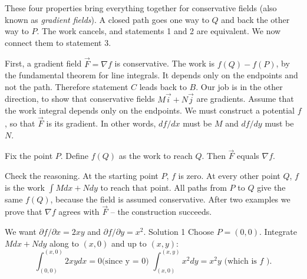{
These four properties bring everything together for conservative fields (also known as \emph{gradient
fields}). A closed path goes one way to $Q$ and back the other way to $P$. The work
cancels, and statements 1 and 2 are equivalent. We now connect them to statement 3. 

First, a gradient field $\vec F = \nabla f$ is conservative. The work is $f(Q) - f(P)$, by the
fundamental theorem for line integrals. It depends only on the endpoints and not the
path. Therefore statement $C$ leads back to $B$.
Our job is in the other direction, to show that conservative fields $M\vec i + N\vec j$ are
gradients. Assume that the work integral depends only on the endpoints. We must
construct a potential $f$, so that $\vec F$ is its gradient. In other words, $df/dx$ must be $M$ and
$df/dy$ must be $N$.

Fix the point $P$. Define $f(Q)$ as the work to reach $Q$. Then $\vec F$ equals $\nabla f$.

Check the reasoning. At the starting point $P$, $f$ is zero. At every other point $Q$, $f$ is
the work $\int M dx + N dy$ to reach that point. All paths from $P$ to $Q$ give the same $f(Q)$,
because the field is assumed conservative. After two examples we prove that $\nabla f$
agrees with $\vec F$ -- the construction succeeds.

 {We want $\partial f /\partial x = 2xy$
and $\partial f/\partial y = x^2$.
Solution 1 Choose $P = (0,0)$. Integrate $M dx + N dy$ along to $(x, 0)$ and up to $(x, y)$:
$$\int_{(0,0)}^{(x,0)}2xydx=0 \text{(since y = 0)   } \int_{(x,0)}^{(x,y)}x^2dy = x^2y \text{ (which is } f \text{ ).}$$ 

}}
